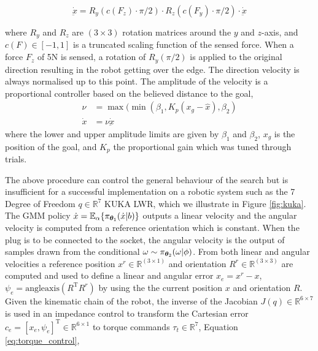 \begin{equation}
  \dot{\underbar{x}} = R_y(c(F_z) \cdot \pi/2) \cdot R_z(c(F_y) \cdot \pi/2) \cdot \dot{\underbar{x}} \label{eq:modulation}
\end{equation}

where $R_y$ and $R_z$ are $(3 \times 3)$ rotation matrices around the $y$ and $z$-axis, and $c(F) \in [-1,1]$ is a truncated scaling function of the sensed 
force.  When a force $F_z$ of 5N is sensed, a rotation of $R_y(\pi/2)$ is applied to the original direction resulting in the robot
getting over the edge. The direction velocity is always normalised up to this point. The amplitude of the velocity is a proportional
controller based on the believed distance to the goal,
\begin{align}
  \nu     &= \max(\min(\beta_1,K_p (x_g - \hat{x}),\beta_2)\label{eq:prop_speed}\\ \nonumber
  \dot{x} &= \nu \dot{\underbar{x}}
\end{align}
where the lower and upper amplitude limits are given by $\beta_1$ and $\beta_2$, $x_g$ is the position of the
goal, and $K_p$ the proportional gain which was tuned through trials. 


The above procedure can control the general behaviour of the search but is insufficient for a successful implementation on a robotic system 
such as the 7 Degree of Freedom $q\in\mathbb{R}^7$ KUKA LWR, which we illustrate in Figure \ref{fig:kuka}. 
The GMM policy $\dot{x} = \mathbb{E}_{\alpha}\{\pi_{\boldsymbol{\theta}_1}(\dot{x}|b)\}$ outputs a linear velocity and the 
angular velocity is computed from a reference orientation which is constant. When the plug is to be connected to the socket, 
the angular velocity is the output of samples drawn from the conditional $\omega \sim \pi_{\boldsymbol{\theta}_2}(\omega|\phi)$.
From both linear and angular velocities a reference position $x^r \in \mathbb{R}^{(3 \times 1)}$ and orientation $R^r \in \mathbb{R}^{(3 \times 3)}$ are computed and used to 
define a linear and angular error $x_e = x^r - x$, $\psi_e = \mathrm{angleaxis}(R^{\mathrm{T}}R^r)$ by using the  
the current position $x$ and orientation $R$.
Given the kinematic chain of the robot, the inverse of the Jacobian $J(q) \in \mathbb{R}^{6\times 7}$ is used in an impedance control to transform the 
Cartesian error $c_e = [x_e,\psi_e]^{\mathrm{T}} \in \mathbb{R}^{6 \times 1}$ to torque commands $\tau_t \in \mathbb{R}^7$, Equation \ref{eq:torque_control},

